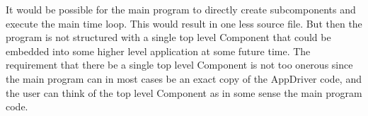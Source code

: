 %


It would be possible for the main program to directly
create subcomponents and execute the main time loop.
This would result in one less source file.  But then the program
is not structured with a single top level Component that could be
embedded into some higher level application at some future time.
The requirement that there be a single top level Component is not 
too onerous since the main program can in most cases be an exact 
copy of the AppDriver code, and the user can think of the top
level Component as in some sense the main program code.


